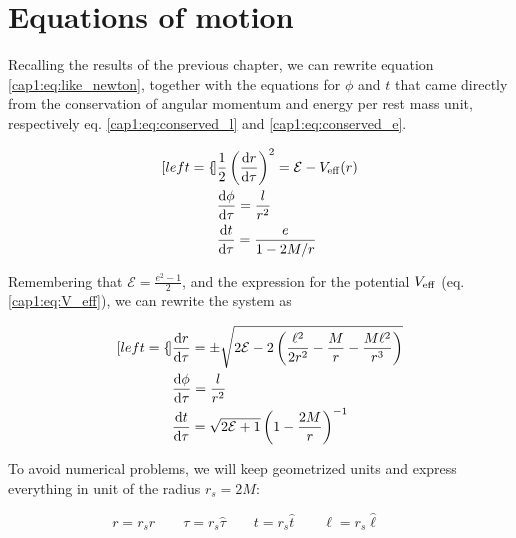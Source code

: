 
\section{Equations of motion}
\label{cap2:sec:eq_of_motion}

Recalling the results of the previous chapter, we can rewrite equation
\eqref{cap1:eq:like_newton}, together with the
equations for $\phi$ and $t$ that came directly from the conservation of
angular momentum and energy per rest mass unit, respectively eq.
\eqref{cap1:eq:conserved_l} and \eqref{cap1:eq:conserved_e}.

\begin{subequations}
	\begin{align}[left = {\empheqlbrace}]
        &\frac{1}{2} \left(\dv{r}{\tau}\right)^2 = \mathcal E - V_{\rm eff} (r)
        \\
        &\dv{\phi}{\tau} = \frac{l}{r^2} \\
        &\dv{t}{\tau} = \frac{e}{1 - 2 M / r}
	\end{align}
\end{subequations}

Remembering that $\mathcal E = \frac{e^2 - 1}{2}$, and the expression for the
potential $V_{\rm eff}$ (eq. \eqref{cap1:eq:V_eff}), we can rewrite the system
as

\begin{subequations}
	\begin{align}[left = {\empheqlbrace}]
        &\dv{r}{\tau} = \pm \sqrt{2 \mathcal E - 2 \left(\frac{\ell^2}{2 r^2} 
        - \frac{M}{r} - \frac{M \ell^2}{r^3} \right)} \label{cap2:eq:radial_eq} \\
        &\dv{\phi}{\tau} = \frac{l}{r^2} \label{cap2:eq:angular_eq} \\
        &\dv{t}{\tau} = \sqrt{2 \mathcal E + 1}\left(1 - \frac{2 M}{r} \right)^{-1}
	\end{align}
\label{cap2:eq:eq_of_motion}
\end{subequations}

To avoid numerical problems, we will keep geometrized units and express
everything in unit of the \Sh radius $r_s = 2 M$:

\begin{equation}
    r = r_s \hat r \quad \quad
    \tau = r_s \hat \tau \quad \quad
    t = r_s \hat t \quad \quad
    \ell = r_s \hat \ell \quad \quad
\end{equation}

